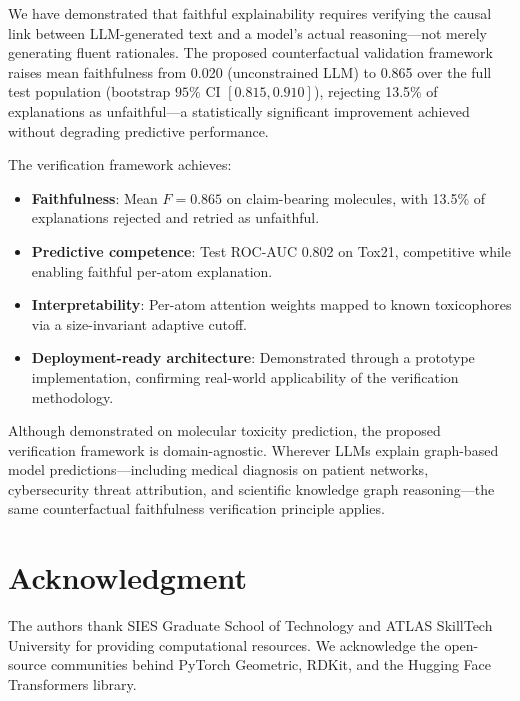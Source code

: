 \documentclass[conference]{IEEEtran}
\newcommand{\Fconstrained}{0.865}   %
\newcommand{\Funconstrained}{0.020}  %
\newcommand{\RejRate}{13.5\%}            %
\begin{document}
We have demonstrated that faithful explainability requires verifying the causal link between LLM-generated text and a model's actual reasoning---not merely generating fluent rationales. The proposed counterfactual validation framework raises mean faithfulness from \Funconstrained{} (unconstrained LLM) to \Fconstrained{} over the full test population (bootstrap $95\%$ CI $[0.815, 0.910]$), rejecting \RejRate{} of explanations as unfaithful---a statistically significant improvement achieved without degrading predictive performance.

The verification framework achieves:
\begin{itemize}
    \item \textbf{Faithfulness}: Mean $F = \Fconstrained{}$ on claim-bearing molecules, with \RejRate{} of explanations rejected and retried as unfaithful.
    \item \textbf{Predictive competence}: Test ROC-AUC 0.802 on Tox21, competitive while enabling faithful per-atom explanation.
    \item \textbf{Interpretability}: Per-atom attention weights mapped to known toxicophores via a size-invariant adaptive cutoff.
    \item \textbf{Deployment-ready architecture}: Demonstrated through a prototype implementation, confirming real-world applicability of the verification methodology.
\end{itemize}

Although demonstrated on molecular toxicity prediction, the proposed verification framework is domain-agnostic. Wherever LLMs explain graph-based model predictions---including medical diagnosis on patient networks, cybersecurity threat attribution, and scientific knowledge graph reasoning---the same counterfactual faithfulness verification principle applies.

\section*{Acknowledgment}

The authors thank SIES Graduate School of Technology and ATLAS SkillTech University for providing computational resources. We acknowledge the open-source communities behind PyTorch Geometric, RDKit, and the Hugging Face Transformers library.



\end{document}
